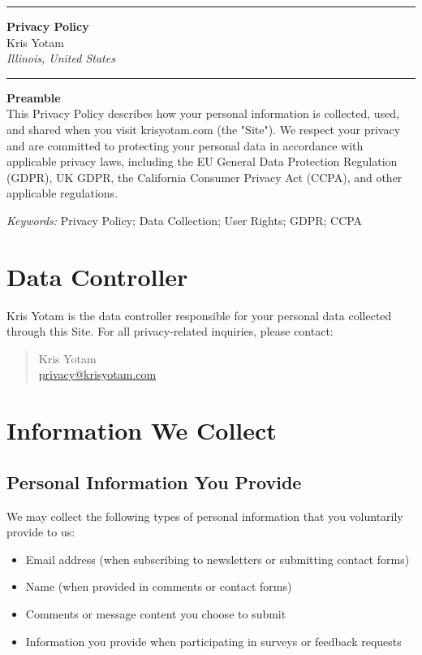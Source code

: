 \documentclass[11pt]{article}
\newcommand{\TitleLine}{\noindent\rule{\textwidth}{0.4pt}}
\begin{document}
\onehalfspacing

\vspace*{-1em}
\TitleLine
\vspace{0.5em}
\begin{center}
  {\Large\bfseries Privacy Policy}\\[0.75em]
  {\normalsize Kris Yotam}\\
  {\itshape Illinois, United States}
\end{center}
\vspace{0.5em}
\TitleLine

\vspace{1.5em}

\noindent\textbf{Preamble}\\
This Privacy Policy describes how your personal information is collected, used, and shared when you visit krisyotam.com (the "Site"). We respect your privacy and are committed to protecting your personal data in accordance with applicable privacy laws, including the EU General Data Protection Regulation (GDPR), UK GDPR, the California Consumer Privacy Act (CCPA), and other applicable regulations.

\vspace{0.75em}
\noindent\textit{Keywords:} Privacy Policy; Data Collection; User Rights; GDPR; CCPA

\vspace{1.5em}

\section{Data Controller}
Kris Yotam is the data controller responsible for your personal data collected through this Site. For all privacy-related inquiries, please contact:

\begin{quote}
  Kris Yotam\\
  \href{mailto:privacy@krisyotam.com}{privacy@krisyotam.com}
\end{quote}

\section{Information We Collect}

\subsection{Personal Information You Provide}
We may collect the following types of personal information that you voluntarily provide to us:
\begin{itemize}
  \item Email address (when subscribing to newsletters or submitting contact forms)
  \item Name (when provided in comments or contact forms)
  \item Comments or message content you choose to submit
  \item Information you provide when participating in surveys or feedback requests
\end{itemize}
\end{document}
